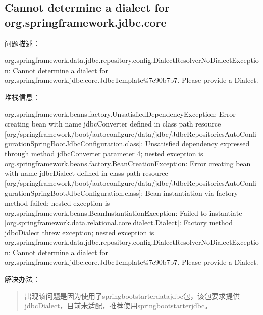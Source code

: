 \documentclass[letterpaper,10pt,english]{sphinxmanual}
\begin{document}
\subsection{Cannot determine a dialect for org.springframework.jdbc.core}
\label{\detokenize{interface/spring-jdbc:cannot-determine-a-dialect-for-org-springframework-jdbc-core}}
问题描述：

\begin{sphinxVerbatim}[commandchars=\\\{\}]
org.springframework.data.jdbc.repository.config.DialectResolver\PYGZdl{}NoDialectException: Cannot determine a dialect for org.springframework.jdbc.core.JdbcTemplate@7c90b7b7. Please provide a Dialect.
\end{sphinxVerbatim}

堆栈信息：

\begin{sphinxVerbatim}[commandchars=\\\{\}]
org.springframework.beans.factory.UnsatisfiedDependencyException: Error creating bean with name \PYGZsq{}jdbcConverter\PYGZsq{} defined in class path resource [org/springframework/boot/autoconfigure/data/jdbc/JdbcRepositoriesAutoConfiguration\PYGZdl{}SpringBootJdbcConfiguration.class]: Unsatisfied dependency expressed through method \PYGZsq{}jdbcConverter\PYGZsq{} parameter 4; nested exception is org.springframework.beans.factory.BeanCreationException: Error creating bean with name \PYGZsq{}jdbcDialect\PYGZsq{} defined in class path resource [org/springframework/boot/autoconfigure/data/jdbc/JdbcRepositoriesAutoConfiguration\PYGZdl{}SpringBootJdbcConfiguration.class]: Bean instantiation via factory method failed; nested exception is org.springframework.beans.BeanInstantiationException: Failed to instantiate [org.springframework.data.relational.core.dialect.Dialect]: Factory method \PYGZsq{}jdbcDialect\PYGZsq{} threw exception; nested exception is org.springframework.data.jdbc.repository.config.DialectResolver\PYGZdl{}NoDialectException: Cannot determine a dialect for org.springframework.jdbc.core.JdbcTemplate@7c90b7b7. Please provide a Dialect.
\end{sphinxVerbatim}

解决办法：
\begin{quote}

出现该问题是因为使用了spring\sphinxhyphen{}boot\sphinxhyphen{}starter\sphinxhyphen{}data\sphinxhyphen{}jdbc包，该包要求提供jdbcDialect，目前未适配，推荐使用spring\sphinxhyphen{}boot\sphinxhyphen{}starter\sphinxhyphen{}jdbc。
\end{quote}
\end{document}
